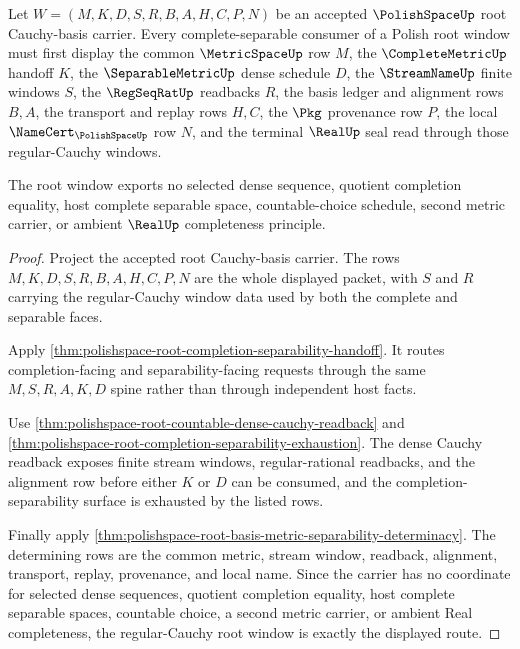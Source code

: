 \begin{theorem}
\label{thm:polishspace-regular-cauchy-root-window}
Let $W=(M,K,D,S,R,B,A,H,C,P,N)$ be an accepted $\PolishSpaceUp$ root Cauchy-basis carrier. Every complete-separable consumer of a Polish root window must first display the common $\MetricSpaceUp$ row $M$, the $\CompleteMetricUp$ handoff $K$, the $\SeparableMetricUp$ dense schedule $D$, the $\StreamNameUp$ finite windows $S$, the $\RegSeqRatUp$ readbacks $R$, the basis ledger and alignment rows $B,A$, the transport and replay rows $H,C$, the $\Pkg$ provenance row $P$, the local $\NameCert_{\PolishSpaceUp}$ row $N$, and the terminal $\RealUp$ seal read through those regular-Cauchy windows.

The root window exports no selected dense sequence, quotient completion equality, host complete separable space, countable-choice schedule, second metric carrier, or ambient $\RealUp$ completeness principle.
\end{theorem}
\begin{proof}
Project the accepted root Cauchy-basis carrier. The rows $M,K,D,S,R,B,A,H,C,P,N$ are the whole displayed packet, with $S$ and $R$ carrying the regular-Cauchy window data used by both the complete and separable faces.

Apply \autoref{thm:polishspace-root-completion-separability-handoff}. It routes completion-facing and separability-facing requests through the same $M,S,R,A,K,D$ spine rather than through independent host facts.

Use \autoref{thm:polishspace-root-countable-dense-cauchy-readback} and \autoref{thm:polishspace-root-completion-separability-exhaustion}. The dense Cauchy readback exposes finite stream windows, regular-rational readbacks, and the alignment row before either $K$ or $D$ can be consumed, and the completion-separability surface is exhausted by the listed rows.

Finally apply \autoref{thm:polishspace-root-basis-metric-separability-determinacy}. The determining rows are the common metric, stream window, readback, alignment, transport, replay, provenance, and local name. Since the carrier has no coordinate for selected dense sequences, quotient completion equality, host complete separable spaces, countable choice, a second metric carrier, or ambient Real completeness, the regular-Cauchy root window is exactly the displayed route.
\end{proof}

